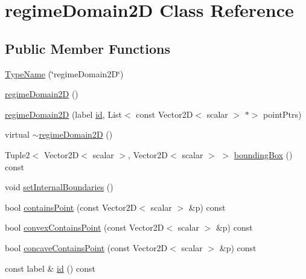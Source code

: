 \hypertarget{classFoam_1_1regimeMapModels_1_1regimeDomain2D}{}\section{regime\+Domain2D Class Reference}
\label{classFoam_1_1regimeMapModels_1_1regimeDomain2D}
\subsection*{Public Member Functions}
\begin{DoxyCompactItemize}
\item 
\hyperlink{classFoam_1_1regimeMapModels_1_1regimeDomain2D_a163b1f8b90e7ddba4bf1faafd72517da}{Type\+Name} (\char`\"{}regime\+Domain2D\char`\"{})
\item 
\hyperlink{classFoam_1_1regimeMapModels_1_1regimeDomain2D_a8e32229e9edae64e9944e610e841ccd0}{regime\+Domain2D} ()
\item 
\hyperlink{classFoam_1_1regimeMapModels_1_1regimeDomain2D_a384b1c7fccbe7faf50caf9f60fe2d227}{regime\+Domain2D} (label \hyperlink{classFoam_1_1regimeMapModels_1_1regimeDomain2D_aafebf45e19e3e59313fe50bcdabf002e}{id}, List$<$ const Vector2D$<$ scalar $>$ $\ast$$>$ point\+Ptrs)
\item 
virtual \hyperlink{classFoam_1_1regimeMapModels_1_1regimeDomain2D_a764df6bdadce33d7cafc56f89070f47c}{$\sim$regime\+Domain2D} ()
\item 
Tuple2$<$ Vector2D$<$ scalar $>$, Vector2D$<$ scalar $>$ $>$ \hyperlink{classFoam_1_1regimeMapModels_1_1regimeDomain2D_aa1071ae7dce8c79110af51424c36b242}{bounding\+Box} () const
\item 
void \hyperlink{classFoam_1_1regimeMapModels_1_1regimeDomain2D_a1b772d919117718f369fc2be429da9b2}{set\+Internal\+Boundaries} ()
\item 
bool \hyperlink{classFoam_1_1regimeMapModels_1_1regimeDomain2D_a3138d8a7a6fc68af7d2275e86708d335}{contains\+Point} (const Vector2D$<$ scalar $>$ \&p) const
\item 
bool \hyperlink{classFoam_1_1regimeMapModels_1_1regimeDomain2D_affaa47a49e83e15e30f5649b0706fbcf}{convex\+Contains\+Point} (const Vector2D$<$ scalar $>$ \&p) const
\item 
bool \hyperlink{classFoam_1_1regimeMapModels_1_1regimeDomain2D_aa27822bb5733a40f30ebea01a0a66bbb}{concave\+Contains\+Point} (const Vector2D$<$ scalar $>$ \&p) const
\item 
const label \& \hyperlink{classFoam_1_1regimeMapModels_1_1regimeDomain2D_aafebf45e19e3e59313fe50bcdabf002e}{id} () const
$$
\end{DoxyCompactItemize}
